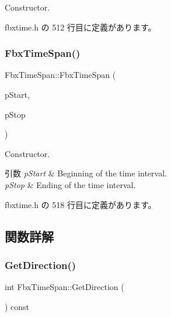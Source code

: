 Constructor. 



 fbxtime.\+h の 512 行目に定義があります。

\mbox{\label{class_fbx_time_span_a50d9ebc7163501aafd108d80673c191b}} 
\subsubsection{\texorpdfstring{Fbx\+Time\+Span()}{FbxTimeSpan()}\hspace{0.1cm}{\footnotesize\ttfamily [2/2]}}
{\footnotesize\ttfamily Fbx\+Time\+Span\+::\+Fbx\+Time\+Span (\begin{DoxyParamCaption}\item[{\hyperlink{class_fbx_time}{Fbx\+Time}}]{p\+Start,  }\item[{\hyperlink{class_fbx_time}{Fbx\+Time}}]{p\+Stop }\end{DoxyParamCaption})\hspace{0.3cm}{\ttfamily [inline]}}

Constructor. 
\begin{DoxyParams}{引数}
{\em p\+Start} & Beginning of the time interval. \\
\hline
{\em p\+Stop} & Ending of the time interval. \\
\hline
\end{DoxyParams}


 fbxtime.\+h の 518 行目に定義があります。



\subsection{関数詳解}
\mbox{\label{class_fbx_time_span_ac53a2eda33c4e23da9417d0b76b67a54}} 
\subsubsection{\texorpdfstring{Get\+Direction()}{GetDirection()}}
{\footnotesize\ttfamily int Fbx\+Time\+Span\+::\+Get\+Direction (\begin{DoxyParamCaption}{ }\end{DoxyParamCaption}) const\hspace{0.3cm}{\ttfamily [inline]}}

